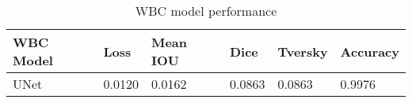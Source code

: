 \begin{table}[H]
\begin{tabular}{|l|l|l|l|l|l|}
\hline
\textbf{WBC Model} & \textbf{Loss}   &\textbf{Mean IOU} & \textbf{Dice}   & \textbf{Tversky} & \textbf{Accuracy} \\ \hline
UNet      & 0.0120 & 0.0162   & 0.0863 & 0.0863  & 0.9976   \\ \hline
\end{tabular}
\caption{WBC model performance}
\label{table:unet-wbc-training}
\end{table}